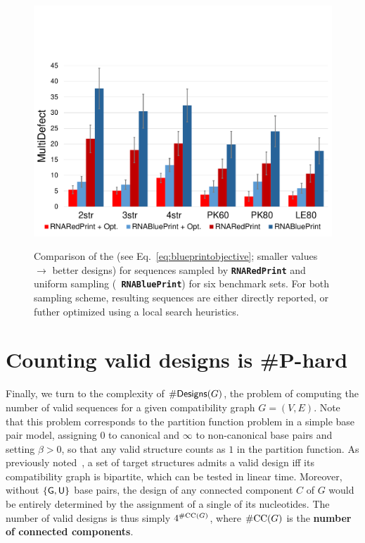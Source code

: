 \documentclass{bioinfo}
\newcommand{\real}{\mathbb{R}}
\newcommand{\Def}[1]{{\bfseries #1}}
\newcommand{\Obj}{\text{\rm MultiDefect}}
\newcommand{\NumDesign}{\ensuremath{\#}{\sf Designs}\xspace}
\newcommand{\Nuc}[1]{{\sf #1}}
\newcommand{\Gb}{\Nuc{G}}
\newcommand{\Ub}{\Nuc{U}}
\newcommand{\RNAblueprint}{{\tt \bfseries{}\color{black!75} RNA\textcolor{blue!70!black}{Blue}Print}}
\newcommand{\ourprog}{{\tt \bfseries{}\color{black!75}RNA\textcolor{red!70!black}{Red}Print}}
\begin{document}
\begin{figure}
  {\includegraphics[width=\linewidth,trim={.2cm .3cm .2cm 5cm},clip]{Figs/statistics-overall}}
  \caption{Comparison of the \Obj{}
  (see Eq.~\eqref{eq:blueprintobjective}; smaller values $\to$ better designs) for sequences sampled by
  \ourprog{} and uniform sampling (\RNAblueprint) for six benchmark sets. For both sampling scheme, resulting sequences are either directly reported, or futher optimized using a local search heuristics.}
\label{fig:benchmark-results}
\end{figure}

\section{Counting valid designs is \#{\sf P}-hard}\label{sec:counting}

Finally, we turn to the complexity of $\NumDesign(G)$, the problem of
computing the number of valid sequences for a given compatibility
graph $G=(V,E)$. Note that this problem corresponds to the partition
function problem in a simple base pair model, assigning $0$ to
canonical and $\infty$ to non-canonical base pairs and setting 
$\beta>0$, so that any valid structure counts as $1$ in the partition 
function. As previously noted~\citep{Flamm2001}, a set of target
structures admits a valid design iff its compatibility graph is
bipartite, which can be tested in linear time.  Moreover, without
$\{\Gb, \Ub\}$ base pairs, the design of any connected component $C$
of $G$ would be entirely determined by the assignment of a single of
its nucleotides. The number of valid designs is thus simply
$4^{\#{\rm CC}(G)}$, where $\#{\rm CC}(G)$ is the \Def{number of
  connected components}.
\end{document}
